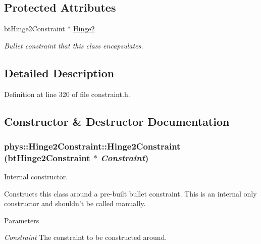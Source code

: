 \subsection*{Protected Attributes}
\begin{DoxyCompactItemize}
\item 
\hypertarget{classphys_1_1Hinge2Constraint_aa32c384f4c51895001e4378342d8f45e}{
btHinge2Constraint $\ast$ \hyperlink{classphys_1_1Hinge2Constraint_aa32c384f4c51895001e4378342d8f45e}{Hinge2}}
\label{d2/d16/classphys_1_1Hinge2Constraint_aa32c384f4c51895001e4378342d8f45e}

\begin{DoxyCompactList}\small\item\em Bullet constraint that this class encapsulates. \item\end{DoxyCompactList}\end{DoxyCompactItemize}


\subsection{Detailed Description}


Definition at line 320 of file constraint.h.



\subsection{Constructor \& Destructor Documentation}
\hypertarget{classphys_1_1Hinge2Constraint_aaf937ddb299b8b47e243e83dfd585e44}{
\subsubsection[{Hinge2Constraint}]{\setlength{\rightskip}{0pt plus 5cm}phys::Hinge2Constraint::Hinge2Constraint (btHinge2Constraint $\ast$ {\em Constraint})}}
\label{d2/d16/classphys_1_1Hinge2Constraint_aaf937ddb299b8b47e243e83dfd585e44}


Internal constructor. 

Constructs this class around a pre-\/built bullet constraint. This is an internal only constructor and shouldn't be called manually. 
\begin{DoxyParams}{Parameters}
\item[{\em Constraint}]The constraint to be constructed around. \end{DoxyParams}



